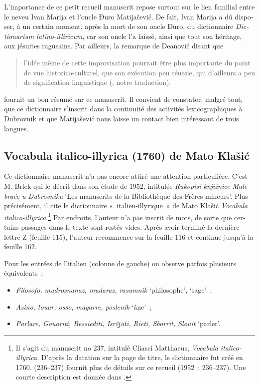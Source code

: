 \documentclass[output=paper,colorlinks,citecolor=brown,arabicfont,chinesefont,booklanguage=french]{langscibook}
\begin{document}
\begin{otherlanguage}{french}
L’importance de ce petit recueil manuscrit repose surtout sur le lien familial entre le neveu Ivan Marija et l’oncle Đuro Matijašević. De fait, Ivan Marija a dû disposer, à un certain moment, après la mort de son oncle Đuro, du dictionnaire \emph{Dictionarium latino-illiricum}, car son oncle l’a laissé, ainsi que tout son héritage, aux jésuites ragusains. Par ailleurs, la remarque de Deanović disant que 

\begin{quote}
    l’idée même de cette improvisation pourrait être plus importante du point de vue historico-culturel, que son exécution peu réussie, qui d’ailleurs a peu de signification linguistique  (\citealt[581]{Deanovic1951}, notre traduction). 
\end{quote}

fournit un bon résumé sur ce manuscrit. Il convient de constater, malgré tout, que ce dictionnaire s’inscrit dans la continuité des activités lexicographiques à Dubrovnik et que Matijašević nous laisse un contact bien intéressant de trois langues.

\subsection{Vocabula italico-illyrica (1760) de Mato Klašić}

Ce dictionnaire manuscrit n’a pas encore attiré une attention particulière. C’est M. Brlek qui le décrit dans son étude de 1952, intitulée \emph{Rukopisi knjižnice Male braće u Dubrovniku} ‘Les manuscrits de la Bibliothèque des Frères mineurs’. Plus précisément, il cite le dictionnaire «~italien-illyrique~» de Mato Klašić \emph{Vocabula italico-illyrica}.\footnote{Il s’agit du manuscrit no 237, intitulé Cliasci Matthaeus, \emph{Vocabula italico-illyrica}. D’après la datation sur la page de titre, le dictionnaire fut créé en 1760. \citet{Brlek1952} (236--237) fournit plus de détails sur ce recueil (1952~: 236--237). Une courte description est donnée dans \citet{Franic2014}.}  Par endroits, l'auteur n'a pas inscrit de mots, de sorte que certains passages dans le texte sont restés vides. Après avoir terminé la dernière lettre Z (feuille 115), l’auteur recommence sur la feuille 116 et continue jusqu’à la feuille 162. 

Pour les entrées de l’italien (colonne de gauche) on observe parfois plusieurs équivalents~:

\begin{itemize}
    \item \emph{Filosofo, mudrosnanaz, mudaraz, rasumnik} ‘philosophe’, ‘sage’~; 
    \item \emph{Asino, touar, osso, magarre, poslenik} ‘âne’~; 
    \item \emph{Parlare, Gouoriti, Bessiediti, Isriʒati, Rieti, Sborrit, Slouit} ‘parler’.
\end{itemize}


\end{otherlanguage}
\end{document}
